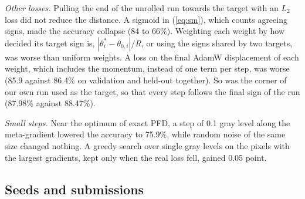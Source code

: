 \documentclass[journal]{IEEEtran}
\begin{document}
\emph{Other losses.} Pulling the end of the unrolled run towards the target with an $L_2$ loss did not reduce the
distance. A sigmoid in (\ref{eq:sm}), which counts agreeing signs, made the accuracy collapse (84 to 66\%). Weighting
each weight by how decided its target sign is, $|\theta^\ast_i-\theta_{0,i}|/R$, or using the signs shared by two
targets, was worse than uniform weights. A loss on the final AdamW displacement of each weight, which includes the
momentum, instead of one term per step, was worse (85.9 against 86.4\% on validation and held-out together). So was
the corner of our own run used as the target, so that every step follows the final sign of the run (87.98\% against
88.47\%).

\emph{Small steps.} Near the optimum of exact PFD, a step of 0.1 gray level along the meta-gradient lowered the
accuracy to 75.9\%, while random noise of the same size changed nothing. A greedy search over single gray levels on
the pixels with the largest gradients, kept only when the real loss fell, gained 0.05 point.

\subsection{Seeds and submissions}
\end{document}
